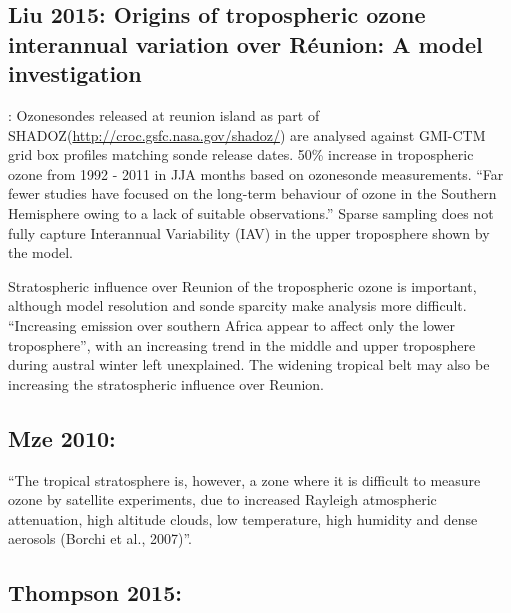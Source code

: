 \documentclass[11pt]{article} %
\begin{document}
  \subsection{Liu 2015: Origins of tropospheric ozone interannual variation over Réunion: A model investigation}
    \citet{Liu2015}:
    Ozonesondes released at reunion island as part of SHADOZ(\url{http://croc.gsfc.nasa.gov/shadoz/}) are analysed against GMI-CTM grid box profiles matching sonde release dates.
    50\% increase in tropospheric ozone from 1992 - 2011 in JJA months based on ozonesonde measurements.
    ``Far fewer studies have focused on the long-term behaviour of ozone in the Southern Hemisphere owing to a lack of suitable observations.''
    Sparse sampling does not fully capture Interannual Variability (IAV) in the upper troposphere shown by the model.
    
    Stratospheric influence over Reunion of the tropospheric ozone is important, although model resolution and sonde sparcity make analysis more difficult.
    ``Increasing emission over southern Africa appear to affect only the lower troposphere'', with an increasing trend in the middle and upper troposphere during austral winter left unexplained.
    The widening tropical belt may also be increasing the stratospheric influence over Reunion.

  \subsection{Mze 2010:}
    \citet{Mze2010}
    ``The tropical stratosphere is, however, a zone where it is difficult to measure ozone by satellite experiments, due to increased Rayleigh atmospheric attenuation, high altitude clouds, low temperature, high humidity and dense aerosols (Borchi et al., 2007)''.

  \subsection{Thompson 2015: }
  
\printbibliography[heading=bibintoc]
\end{document}
